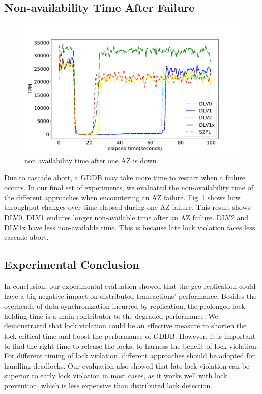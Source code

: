 \documentclass[conference]{IEEEtran}
\begin{document}
\subsection{Non-availability Time After Failure}

\begin{figure}[tbp]
  \centering
  { \includegraphics[scale=0.36] {figure/plot_availability}
  \caption{non availability time after one AZ is down}
  \label{fig:plot_availability:tpm}}
\end{figure}


Due to cascade abort, a GDDB may take more time to restart when a failure occurs.
In our final set of experiments, we evaluated the non-availability time of the different approaches when encountering an AZ failure.
Fig~\ref{fig:plot_availability:tpm} shows how throughput changes over time elapsed during one AZ failure.
This result shows DLV0, DLV1 endures longer non-available time after an AZ failure.
DLV2 and DLV1x have less non-available time. This is because late lock violation faces less cascade abort.


\subsection{Experimental Conclusion}

In conclusion, our experimental evaluation showed that the geo-replication could have a big negative impact on distributed transactions' performance.
Besides the overheads of data synchronization incurred by replication, the prolonged lock holding time is a main contributor to the degraded performance.
We demonstrated that lock violation could be an effective measure to shorten the lock critical time and boost the performance of GDDB.
However, it is important to find the right time to release the locks, to harness the benefit of lock violation.
For different timing of lock violation, different approaches should be adopted for handling deadlocks.
Our evaluation also showed that late lock violation can be superior to early lock violation in most cases, as it works well with lock prevention, which is less expensive than distributed lock detection.
\end{document}
